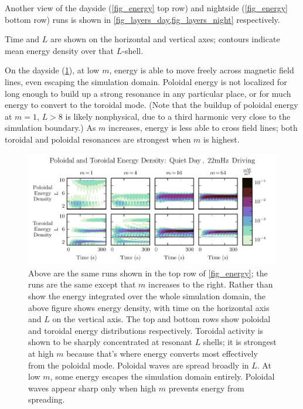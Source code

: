 \documentclass[draft,linenumbers]{agujournal}
\begin{document}
Another view of the dayside (\cref{fig_energy} top row) and nightside (\cref{fig_energy} bottom row) runs is shown in \cref{fig_layers_day,fig_layers_night} respectively.

Time and $L$ are shown on the horizontal and vertical axes; contours indicate mean energy density over that $L$-shell.

On the dayside (\cref{fig_layers_day}), at low $m$, energy is able to move freely across magnetic field lines, even escaping the simulation domain. Poloidal energy is not localized for long enough to build up a strong resonance in any particular place, or for much energy to convert to the toroidal mode. (Note that the buildup of poloidal energy at $m = 1$, $L > 8$ is likely nonphysical, due to a third harmonic very close to the simulation boundary.) As $m$ increases, energy is less able to cross field lines; both toroidal and poloidal resonances are strongest when $m$ is highest.

\begin{figure}
    \begin{center}
    \includegraphics[width=\textwidth]{figures/fig_layers_day.pdf}
    \caption{
        Above are the same runs shown in the top row of \cref{fig_energy}; the runs are the same except that $m$ increases to the right. Rather than show the energy integrated over the whole simulation domain, the above figure shows energy density, with time on the horizontal axis and $L$ on the vertical axis. The top and bottom rows show poloidal and toroidal energy distributions respectively. Toroidal activity is shown to be sharply concentrated at resonant $L$ shells; it is strongest at high $m$ because that's where energy converts most effectively from the poloidal mode. Poloidal waves are spread broadly in $L$. At low $m$, some energy escapes the simulation domain entirely. Poloidal waves appear sharp only when high $m$ prevents energy from spreading.
    }
    \label{fig_layers_day}
    \end{center}
\end{figure}
\end{document}
